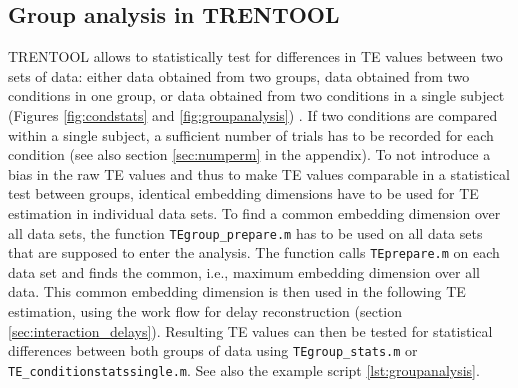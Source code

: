 \documentclass[a4paper,10pt]{article}
\begin{document}
\subsection{Group analysis in TRENTOOL} \label{sec:groupanalysis}

TRENTOOL allows to statistically test for differences in TE values between two sets of data: either data obtained from two groups, data obtained from two conditions in one group, or data obtained from two conditions in a single subject (Figures \ref{fig:condstats} and \ref{fig:groupanalysis}) \cite{lindner2011}. If two conditions are compared within a single subject, a sufficient number of trials has to be recorded for each condition (see also section \ref{sec:numperm} in the appendix). To not introduce a bias in the raw TE values and thus to make TE values comparable in a statistical test between groups, identical embedding dimensions have to be used for TE estimation in individual data sets. To find a common embedding dimension over all data sets, the function \verb&TEgroup_prepare.m& has to be used on all data sets that are supposed to enter the analysis. The function calls \verb&TEprepare.m& on each data set and finds the common, i.e., maximum embedding dimension over all data. This common embedding dimension is then used in the following TE estimation, using the work flow for delay reconstruction (section \ref{sec:interaction_delays}). Resulting TE values can then be tested for statistical differences between both groups of data using \verb&TEgroup_stats.m& or \verb&TE_conditionstatssingle.m&. See also the example script \ref{lst:groupanalysis}.
\end{document}
